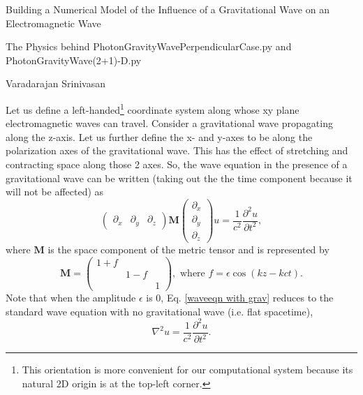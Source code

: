 \documentclass{article}
\begin{document}
\begin{flushleft}
{\large Building a Numerical Model of the Influence of a Gravitational Wave on an Electromagnetic Wave}

The Physics behind PhotonGravityWavePerpendicularCase.py and PhotonGravityWave(2+1)-D.py

\smallskip
Varadarajan Srinivasan
\smallskip
\end{flushleft}

Let us define a left-handed\footnote{This orientation is more convenient for our computational system because its natural 2D origin is at the top-left corner.} coordinate system along whose xy plane electromagnetic waves can travel. Consider a gravitational wave propagating along the z-axis. Let us further define the x- and y-axes to be along the polarization axes of the gravitational wave. This has the effect of stretching and contracting space along those 2 axes. So, the wave equation in the presence of a gravitational wave can be written (taking out the the time component because it will not be affected) as
\begin{equation} \label{waveeqn with grav}
\begin{pmatrix}\partial_x & \partial_y & \partial_z\end{pmatrix} 
\textbf{M}
\begin{pmatrix} \partial_x \\ \partial_y \\ \partial_z \end{pmatrix}
u
=\frac{1}{c^2}\frac{\partial^2 u}{\partial t^2},
\end{equation}
where $\textbf{M}$ is the space component of the metric tensor and is represented by
\begin{equation} \label{M}
\textbf{M}=\begin{pmatrix}
1+f \\
 & 1-f \\
 & & 1
\end{pmatrix},
\text{ \ \ \ where } f=\epsilon \cos(kz-kct).
\end{equation}
Note that when the amplitude $\epsilon$ is 0, Eq. \ref{waveeqn with grav} reduces to the standard wave equation with no gravitational wave (i.e. flat spacetime),
\begin{equation} \label{waveeqn flat}
\nabla^2u=\frac{1}{c^2}\frac{\partial^2u}{\partial t^2}.
\end{equation}
\end{document}

